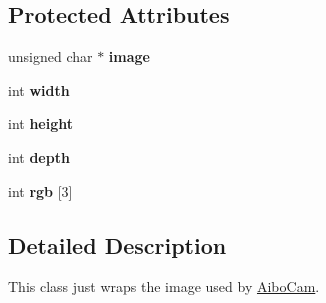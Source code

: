 \subsection*{Protected Attributes}
\begin{DoxyCompactItemize}
\item 
\hypertarget{classdev_a8e333c6cddc88bf779860ea4a3b6520e}{
unsigned char $\ast$ {\bfseries image}}
\label{classdev_a8e333c6cddc88bf779860ea4a3b6520e}

\item 
\hypertarget{classdev_a11d029d54d3705815b303480e6afa550}{
int {\bfseries width}}
\label{classdev_a11d029d54d3705815b303480e6afa550}

\item 
\hypertarget{classdev_a02cfa33ffda59395bd35f7981be4549d}{
int {\bfseries height}}
\label{classdev_a02cfa33ffda59395bd35f7981be4549d}

\item 
\hypertarget{classdev_a917c7f62c2c4c07ab51c2c9b00a9f587}{
int {\bfseries depth}}
\label{classdev_a917c7f62c2c4c07ab51c2c9b00a9f587}

\item 
\hypertarget{classdev_a5292d1ac643cc0fa3413406b5600142e}{
int {\bfseries rgb} \mbox{[}3\mbox{]}}
\label{classdev_a5292d1ac643cc0fa3413406b5600142e}

\end{DoxyCompactItemize}


\subsection{Detailed Description}
This class just wraps the image used by \hyperlink{classAiboCam}{AiboCam}. 

